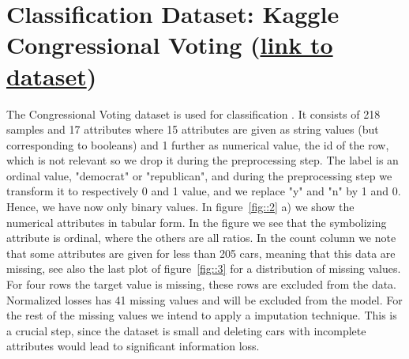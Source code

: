 \documentclass[11pt]{article}
\begin{document}
\section{Classification Dataset: Kaggle Congressional Voting (\href{https://www.kaggle.com/c/184702-tu-ml-ss-21-congressional-voting/overview}{link to dataset})}
The Congressional Voting dataset is used for classification . It consists of 218 samples and 17 attributes where 15 attributes are given as string values (but corresponding to booleans) and 1 further as numerical value, the id of the row, which is not relevant so we drop it during the preprocessing step. The label is an ordinal value, "democrat" or "republican", and during the preprocessing step we transform it to respectively 0 and 1 value, and we replace "y" and "n" by 1 and 0. Hence, we have now only binary values. In figure~\ref{fig::2} a) we show the numerical attributes in tabular form. In the figure we see that the symbolizing attribute is ordinal, where the others are all ratios. In the count column we note that some attributes are given for less than 205 cars, meaning that this data are missing, see also the last plot of figure~\ref{fig::3} for a distribution of missing values. For four rows the target value is missing, these rows are excluded from the data. Normalized losses has 41 missing values and will be excluded from the model. For the rest of the missing values we intend to apply a imputation technique. This is a crucial step, since the dataset is small and deleting cars with incomplete attributes would lead to significant information loss.%
  
\end{document}
